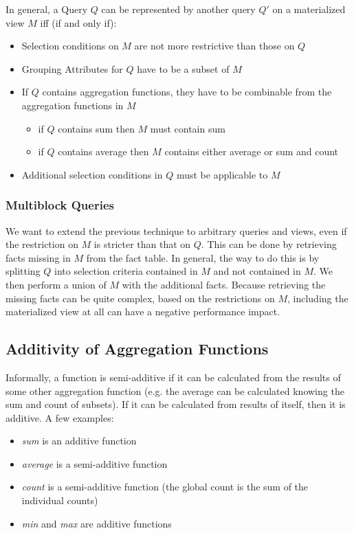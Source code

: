 \documentclass{article}
\begin{document}
In general, a Query $Q$ can be represented by another query $Q'$ on a materialized view $M$ iff (if and only if):
\begin{itemize}
    \item Selection conditions on $M$ are not more restrictive than those on $Q$
    \item Grouping Attributes for $Q$ have to be a subset of $M$
    \item If $Q$ contains aggregation functions, they have to be combinable from the aggregation functions in $M$
        \begin{itemize}
            \item if $Q$ contains sum then $M$ must contain sum
            \item if $Q$ contains average then $M$ contains either average or sum and count
        \end{itemize}
    \item Additional selection conditions in $Q$ must be applicable to $M$
\end{itemize}

\subsubsection{Multiblock Queries}
We want to extend the previous technique to arbitrary queries and views, even if the restriction on $M$ is stricter than that on $Q$.
This can be done by retrieving facts missing in $M$ from the fact table.
In general, the way to do this is by splitting $Q$ into selection criteria contained in $M$ and not contained in $M$.
We then perform a union of $M$ with the additional facts.
Because retrieving the missing facts can be quite complex, based on the restrictions on $M$, including the materialized view at all can have a negative performance impact.

\subsection{Additivity of Aggregation Functions}
Informally, a function is semi-additive if it can be calculated from the results of some other aggregation function (e.g. the average can be calculated knowing the sum and count of subsets).
If it can be calculated from results of itself, then it is additive.
A few examples:
\begin{itemize}
    \item \textit{sum} is an additive function
    \item \textit{average} is a semi-additive function
    \item \textit{count} is a semi-additive function (the global count is the sum of the individual counts)
    \item \textit{min} and \textit{max} are additive functions
\end{itemize}
\end{document}
